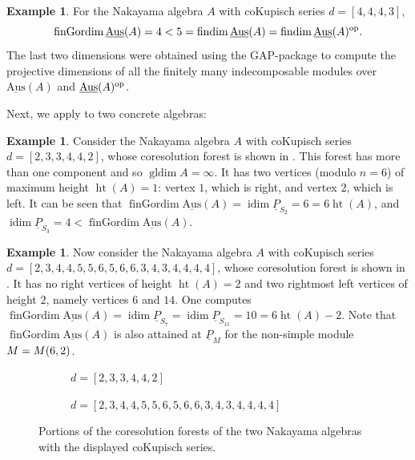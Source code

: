 \documentclass[a4paper]{amsart}
\theoremstyle{definition}
\newtheorem{example}[theorem]{Example}
\theoremstyle{remark}
\numberwithin{equation}{theorem}
\newcommand{\findim}{\operatorname{findim}}
\newcommand{\sAus}{\operatorname{\underline{Aus}}}
\newcommand{\pstab}[1]{\underline{P}_{#1}}
\newcommand{\fingordim}{\operatorname{finGordim}}
\newcommand{\height}{\operatorname{ht}}
\newcommand{\idim}{\operatorname{idim}}
\newcommand{\gldim}{\operatorname{gldim}}
\newcommand{\op}{\textnormal{op}}
\begin{document}
\begin{example}\label{fGd.less.than.findim}
For the Nakayama algebra $A$ with coKupisch series $d = [4,4,4,3]$,
    \[
        \fingordim \sAus(A) = 4 < 5 = \findim \sAus(A) = \findim \sAus(A)^\op  .
    \]
The last two dimensions were obtained using the GAP-package \cite{QPA} to compute the projective dimensions of all the finitely many indecomposable modules over $ \sAus(A) $ and $ \sAus(A)^\op $.
\end{example}

Next, we apply  to two concrete algebras:


\begin{example}
Consider the Nakayama algebra $ A $ with coKupisch series $ d = [2, \allowbreak 3, \allowbreak 3,4,4,2] $, whose coresolution forest is shown in .
This forest has more than one component and so $ \gldim A = \infty $.
It has two vertices (modulo $n=6$) of maximum height $ \height(A)=1 $: vertex $1$, which is right, and vertex $2$, which is left.
It can be seen that $\fingordim \sAus(A) = \idim \pstab{S_2} = 6 = 6 \height(A)$, and $\idim \pstab{S_3} = 4 < \fingordim \sAus(A)$.
\end{example}

\begin{example}
Now consider the Nakayama algebra $ A $ with coKupisch series $ d = [2,3,4,4,5,5,6,5,6,6,3,4,3,4,4,4,4] $, whose coresolution forest is shown in .
It has no right vertices of height $\height(A)=2$ and two rightmost left vertices of height $ 2 $, namely vertices $6$ and $14$.
One computes $\fingordim \sAus(A) = \idim \pstab{S_7} = \idim \pstab{S_{15}} = 10 = 6 \height(A) - 2$.
Note that $\fingordim \sAus (A) $ is also attained at $\pstab{M}$ for the non-simple module $M = \mik[6][2]$.
\begin{figure}[t]
   \begin{subfigure}[t]{0.38\textwidth}
      \centering
        
        \caption{$d = [2,3,3,4,4,2]$}
        \label{fig:coresforest-233442}
    \end{subfigure}\hfill
    \begin{subfigure}[t]{0.58\textwidth}
      \centering
      
      \caption{$d = [2,3,4,4,5,5,6,5,6,6,3,4,3,4,4,4,4]$}
      \label{fig:coresforest-23445565663434444}
    \end{subfigure}
    \caption{Portions of the coresolution forests of the two Nakayama algebras with the displayed coKupisch series.}
      \label{fig:boundsexample}
\end{figure}
\end{example}
\end{document}
